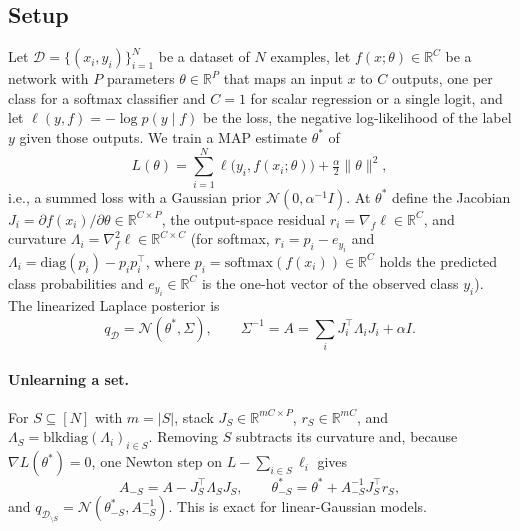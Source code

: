 \documentclass[10pt,twocolumn,letterpaper]{article}
\theoremstyle{definition}
\newcommand{\N}{\mathcal{N}}
\newcommand{\D}{\mathcal{D}}
\newcommand{\DS}{\mathcal{D}_{\setminus S}}
\newcommand{\T}{^{\top}}
\begin{document}
\subsection{Setup}
Let $\D=\{(x_i,y_i)\}_{i=1}^N$ be a dataset of $N$ examples, let $f(x;\theta)\in\mathbb{R}^C$ be a network with $P$ parameters $\theta\in\mathbb{R}^P$ that maps an input $x$ to $C$ outputs, one per class for a softmax classifier and $C=1$ for scalar regression or a single logit, and let $\ell(y,f)=-\log p(y\mid f)$ be the loss, the negative log-likelihood of the label $y$ given those outputs. We train a MAP estimate $\theta^*$ of
\begin{equation}
L(\theta)=\textstyle\sum_{i=1}^N \ell\big(y_i,f(x_i;\theta)\big)+\tfrac{\alpha}{2}\|\theta\|^2,
\label{eq:objective}
\end{equation}
i.e., a summed loss with a Gaussian prior $\N(0,\alpha^{-1}I)$. At $\theta^*$ define the Jacobian $J_i=\partial f(x_i)/\partial\theta\in\mathbb{R}^{C\times P}$, the output-space residual $r_i=\nabla_f\ell\in\mathbb{R}^C$, and curvature $\Lambda_i=\nabla^2_f\ell\in\mathbb{R}^{C\times C}$ (for softmax, $r_i=p_i-e_{y_i}$ and $\Lambda_i=\mathrm{diag}(p_i)-p_ip_i\T$, where $p_i=\mathrm{softmax}(f(x_i))\in\mathbb{R}^C$ holds the predicted class probabilities and $e_{y_i}\in\mathbb{R}^C$ is the one-hot vector of the observed class $y_i$). The linearized Laplace posterior is
\begin{equation}
q_\D=\N(\theta^*,\Sigma),\qquad \Sigma^{-1}=A=\textstyle\sum_i J_i\T\Lambda_iJ_i+\alpha I.
\label{eq:laplace}
\end{equation}

\paragraph{Unlearning a set.} For $S\subseteq[N]$ with $m=|S|$, stack $J_S\in\mathbb{R}^{mC\times P}$, $r_S\in\mathbb{R}^{mC}$, and $\Lambda_S=\mathrm{blkdiag}(\Lambda_i)_{i\in S}$. Removing $S$ subtracts its curvature and, because $\nabla L(\theta^*)=0$, one Newton step on $L-\sum_{i\in S}\ell_i$ gives
\begin{equation}
A_{-S}=A-J_S\T\Lambda_SJ_S,\qquad \theta^*_{-S}=\theta^*+A_{-S}^{-1}J_S\T r_S,
\label{eq:unlearn}
\end{equation}
and $q_{\DS}=\N(\theta^*_{-S},A_{-S}^{-1})$. This is exact for linear-Gaussian models.
\end{document}
